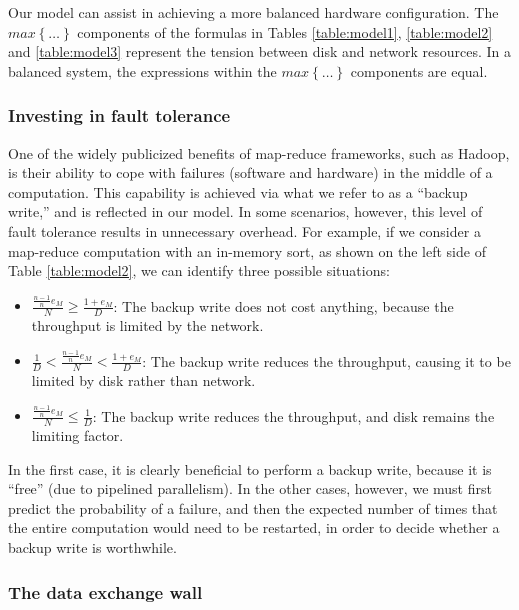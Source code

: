 \documentclass{acm_proc_article-sp}
\begin{document}
Our model can assist in achieving a more balanced
hardware configuration. The $max\left\{\ldots\right\}$ components of the
formulas in Tables \ref{table:model1}, \ref{table:model2} and
\ref{table:model3} represent the tension between disk and network resources. In
a balanced system, the expressions within the $max\left\{\ldots\right\}$
components are equal.

\subsubsection{Investing in fault tolerance}

One of the widely publicized benefits of map-reduce frameworks, such as Hadoop,
is their ability to cope with failures (software and hardware) in the middle of
a computation. This capability is achieved via what we refer to as a ``backup
write,'' and is reflected in our model. In some scenarios, however, this level
of fault tolerance results in unnecessary overhead. For example, if we consider
a map-reduce computation with an in-memory sort, as shown on the left side of
Table \ref{table:model2}, we can identify three possible situations:

\begin{itemize}
  \item $\frac{\frac{n-1}{n} e_M}{N} \ge \frac{1+e_M}{D}$: The backup write does
  not cost anything, because the throughput is limited by the network.
  \item $\frac{1}{D} < \frac{\frac{n-1}{n} e_M}{N} < \frac{1+e_M}{D}$: The
  backup write reduces the throughput, causing it to be limited by disk rather than network.
  \item $\frac{\frac{n-1}{n} e_M}{N} \le \frac{1}{D}$: The backup write reduces
  the throughput, and disk remains the limiting factor.
\end{itemize}

In the first case, it is clearly beneficial to perform a backup write, because it is ``free'' (due to pipelined parallelism). In the other cases, however, we must first predict the probability of a failure, and then the expected number of times that the entire computation would need to be restarted, in order to decide whether a backup write is worthwhile.

\subsubsection{The data exchange wall}
\end{document}
